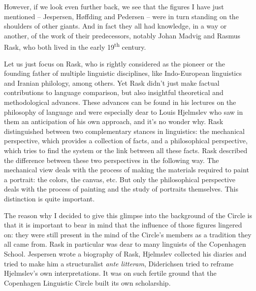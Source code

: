 \begin{styleStandard}
However, if we look even further back, we see that the figures I have just mentioned – Jespersen, Høffding and Pedersen – were in turn standing on the shoulders of other giants. And in fact they all had knowledge, in a way or another, of the work of their predecessors, notably Johan Madvig and Rasmus Rask, who both lived in the early 19\textsuperscript{th} century. 
\end{styleStandard}

\begin{styleStandard}
Let us just focus on Rask, who is rightly considered as the pioneer or the founding father of multiple linguistic disciplines, like Indo-European linguistics and Iranian philology, among others. Yet Rask didn’t just make factual contributions to language comparison, but also insightful theoretical and methodological advances. These advances can be found in his lectures on the philosophy of language and were especially dear to Louis Hjelmslev who saw in them an anticipation of his own approach, and it’s no wonder why. Rask distinguished between two complementary stances in linguistics: the mechanical perspective, which provides a collection of facts, and a philosophical perspective, which tries to find the system or the link between all these facts. Rask described the difference between these two perspectives in the following way. The mechanical view deals with the process of making the materials required to paint a portrait: the colors, the canvas, etc. But only the philosophical perspective deals with the process of painting and the study of portraits themselves. This distinction is quite important. 
\end{styleStandard}

\begin{styleStandard}
The reason why I decided to give this glimpse into the background of the Circle is that it is important to bear in mind that the influence of those figures lingered on: they were still present in the mind of the Circle’s members as a tradition they all came from. Rask in particular was dear to many linguists of the Copenhagen School. Jespersen wrote a biography of Rask, Hjelmslev collected his diaries and tried to make him a structuralist \textit{ante litteram}, Diderichsen tried to reframe Hjelmslev’s own interpretations. It was on such fertile ground that the Copenhagen Linguistic Circle built its own scholarship. 
\end{styleStandard}

